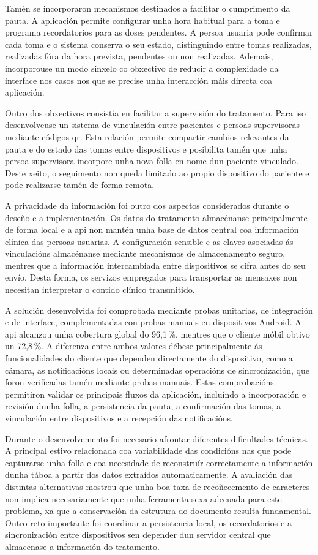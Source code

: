 Tamén se incorporaron mecanismos destinados a facilitar o cumprimento da pauta. A aplicación permite configurar unha hora habitual para a toma e programa recordatorios para as doses pendentes. A persoa usuaria pode confirmar cada toma e o sistema conserva o seu estado, distinguindo entre tomas realizadas, realizadas fóra da hora prevista, pendentes ou non realizadas. Ademais, incorporouse un modo sinxelo co obxectivo de reducir a complexidade da interface nos casos nos que se precise unha interacción máis directa coa aplicación.

Outro dos obxectivos consistía en facilitar a supervisión do tratamento. Para iso desenvolveuse un sistema de vinculación entre pacientes e persoas supervisoras mediante códigos \gls{qr}. Esta relación permite compartir cambios relevantes da pauta e do estado das tomas entre dispositivos e posibilita tamén que unha persoa supervisora incorpore unha nova folla en nome dun paciente vinculado. Deste xeito, o seguimento non queda limitado ao propio dispositivo do paciente e pode realizarse tamén de forma remota.

A privacidade da información foi outro dos aspectos considerados durante o deseño e a implementación. Os datos do tratamento almacénanse principalmente de forma local e a \gls{api} non mantén unha base de datos central coa información clínica das persoas usuarias. A configuración sensible e as claves asociadas ás vinculacións almacénanse mediante mecanismos de almacenamento seguro, mentres que a información intercambiada entre dispositivos se cifra antes do seu envío. Desta forma, os servizos empregados para transportar as mensaxes non necesitan interpretar o contido clínico transmitido.

A solución desenvolvida foi comprobada mediante probas unitarias, de integración e de interface, complementadas con probas manuais en dispositivos Android. A \gls{api} alcanzou unha cobertura global do 96,1\,\%, mentres que o cliente móbil obtivo un 72,8\,\%. A diferenza entre ambos valores débese principalmente ás funcionalidades do cliente que dependen directamente do dispositivo, como a cámara, as notificacións locais ou determinadas operacións de sincronización, que foron verificadas tamén mediante probas manuais. Estas comprobacións permitiron validar os principais fluxos da aplicación, incluíndo a incorporación e revisión dunha folla, a persistencia da pauta, a confirmación das tomas, a vinculación entre dispositivos e a recepción das notificacións.

Durante o desenvolvemento foi necesario afrontar diferentes dificultades técnicas. A principal estivo relacionada coa variabilidade das condicións nas que pode capturarse unha folla e coa necesidade de reconstruír correctamente a información dunha táboa a partir dos datos extraídos automaticamente. A avaliación das distintas alternativas mostrou que unha boa taxa de recoñecemento de caracteres non implica necesariamente que unha ferramenta sexa adecuada para este problema, xa que a conservación da estrutura do documento resulta fundamental. Outro reto importante foi coordinar a persistencia local, os recordatorios e a sincronización entre dispositivos sen depender dun servidor central que almacenase a información do tratamento.

